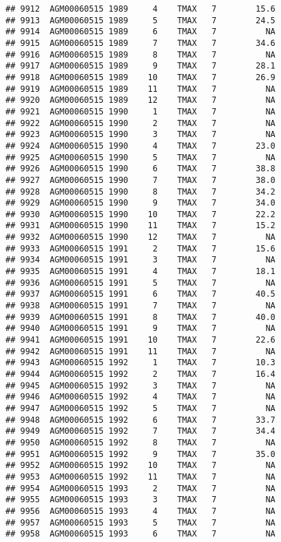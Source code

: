 \documentclass{article}\usepackage[]{graphicx}\usepackage[]{color}
\makeatletter
\newenvironment{kframe}{%
 \def\at@end@of@kframe{}%
 \ifinner\ifhmode%
  \def\at@end@of@kframe{\end{minipage}}%
  \begin{minipage}{\columnwidth}%
 \fi\fi%
 \def\FrameCommand##1{\hskip\@totalleftmargin \hskip-\fboxsep
 \colorbox{shadecolor}{##1}\hskip-\fboxsep
     \hskip-\linewidth \hskip-\@totalleftmargin \hskip\columnwidth}%
 \MakeFramed {\advance\hsize-\width
   \@totalleftmargin\z@ \linewidth\hsize
   \@setminipage}}%
 {\par\unskip\endMakeFramed%
 \at@end@of@kframe}
\newenvironment{knitrout}{}{} %
\makeatother
\begin{document}
\begin{knitrout}
\begin{kframe}
\begin{verbatim}
## 9912  AGM00060515 1989     4    TMAX   7        15.6
## 9913  AGM00060515 1989     5    TMAX   7        24.5
## 9914  AGM00060515 1989     6    TMAX   7          NA
## 9915  AGM00060515 1989     7    TMAX   7        34.6
## 9916  AGM00060515 1989     8    TMAX   7          NA
## 9917  AGM00060515 1989     9    TMAX   7        28.1
## 9918  AGM00060515 1989    10    TMAX   7        26.9
## 9919  AGM00060515 1989    11    TMAX   7          NA
## 9920  AGM00060515 1989    12    TMAX   7          NA
## 9921  AGM00060515 1990     1    TMAX   7          NA
## 9922  AGM00060515 1990     2    TMAX   7          NA
## 9923  AGM00060515 1990     3    TMAX   7          NA
## 9924  AGM00060515 1990     4    TMAX   7        23.0
## 9925  AGM00060515 1990     5    TMAX   7          NA
## 9926  AGM00060515 1990     6    TMAX   7        38.8
## 9927  AGM00060515 1990     7    TMAX   7        38.0
## 9928  AGM00060515 1990     8    TMAX   7        34.2
## 9929  AGM00060515 1990     9    TMAX   7        34.0
## 9930  AGM00060515 1990    10    TMAX   7        22.2
## 9931  AGM00060515 1990    11    TMAX   7        15.2
## 9932  AGM00060515 1990    12    TMAX   7          NA
## 9933  AGM00060515 1991     2    TMAX   7        15.6
## 9934  AGM00060515 1991     3    TMAX   7          NA
## 9935  AGM00060515 1991     4    TMAX   7        18.1
## 9936  AGM00060515 1991     5    TMAX   7          NA
## 9937  AGM00060515 1991     6    TMAX   7        40.5
## 9938  AGM00060515 1991     7    TMAX   7          NA
## 9939  AGM00060515 1991     8    TMAX   7        40.0
## 9940  AGM00060515 1991     9    TMAX   7          NA
## 9941  AGM00060515 1991    10    TMAX   7        22.6
## 9942  AGM00060515 1991    11    TMAX   7          NA
## 9943  AGM00060515 1992     1    TMAX   7        10.3
## 9944  AGM00060515 1992     2    TMAX   7        16.4
## 9945  AGM00060515 1992     3    TMAX   7          NA
## 9946  AGM00060515 1992     4    TMAX   7          NA
## 9947  AGM00060515 1992     5    TMAX   7          NA
## 9948  AGM00060515 1992     6    TMAX   7        33.7
## 9949  AGM00060515 1992     7    TMAX   7        34.4
## 9950  AGM00060515 1992     8    TMAX   7          NA
## 9951  AGM00060515 1992     9    TMAX   7        35.0
## 9952  AGM00060515 1992    10    TMAX   7          NA
## 9953  AGM00060515 1992    11    TMAX   7          NA
## 9954  AGM00060515 1993     2    TMAX   7          NA
## 9955  AGM00060515 1993     3    TMAX   7          NA
## 9956  AGM00060515 1993     4    TMAX   7          NA
## 9957  AGM00060515 1993     5    TMAX   7          NA
## 9958  AGM00060515 1993     6    TMAX   7          NA

\end{verbatim}
\end{kframe}
\end{knitrout}
\end{document}
